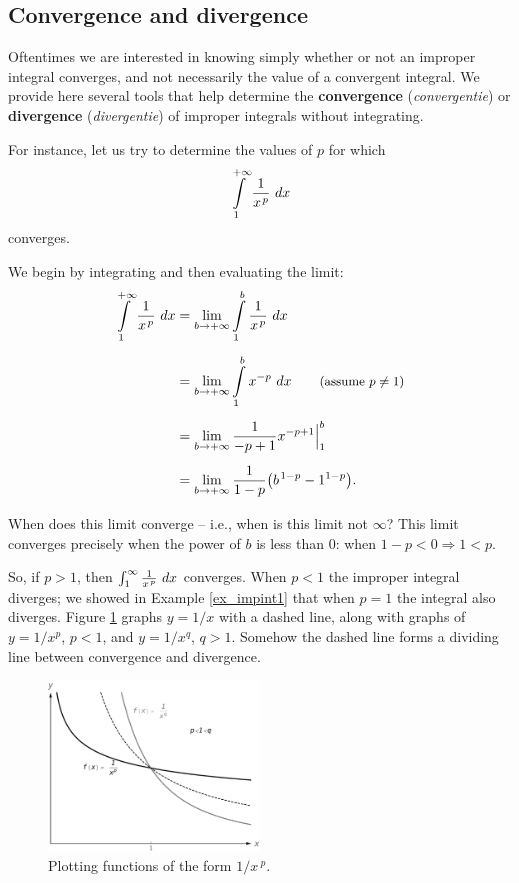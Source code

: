 \ifanalysis
\subsection{Convergence and divergence}

Oftentimes we are interested in knowing simply whether or not an improper integral converges, and not necessarily the value of a convergent integral. We provide here several tools that help determine the \textbf{convergence} (\textit{convergentie}) or \textbf{divergence} (\textit{divergentie}) of improper integrals without integrating.
 
 

For instance, let us try to determine the values of $p$ for which 
$$\displaystyle \int\limits_1^{+\infty} \frac1{x\hskip1pt ^p}\ dx$$
 converges.

We begin by integrating and then evaluating the limit:
\allowdisplaybreaks
\begin{align*}
\ds \int\limits_1^{+\infty} \frac1{x\hskip1pt ^p}\ dx &=	\lim_{b\to+\infty}\ds \int\limits_1^b\frac1{x\hskip1pt ^p}\ dx\\[0.2cm]
		&=	\lim_{b\to+\infty}\ds \int\limits_1^b x^{-p}\ dx \qquad \text{\small (assume $p\neq 1$)}\\[0.2cm]
		&= \lim_{b\to+\infty} \frac{1}{-p+1}x^{-p+1}\Big|_1^b\\[0.2cm]
		&= \lim_{b\to+\infty} \frac{1}{1-p}\big(b\hskip1pt^{1-p}-1^{1-p}\big).\\[0.2cm]
\end{align*}
When does this limit converge -- i.e., when is this limit not $\infty$? This limit converges precisely when the power of $b$ is less than 0: when $1-p<0 \Rightarrow 1<p$. 


So, if $p>1$, then $\int_1^\infty \frac1{x\hskip1pt ^p}\ dx $ converges. When $p<1$ the improper integral diverges; we showed in Example \ref{ex_impint1} that when $p=1$ the integral also diverges.  Figure \ref{fig_int_17} graphs $y=1/x$ with a dashed line, along with graphs of $y=1/x^p$, $p<1$, and $y=1/x^q$, $q>1$. Somehow the dashed line forms a dividing line between convergence and divergence. 

\begin{figure}
	\begin{center}
			\includegraphics[width=0.5\textwidth]{fig_int_17}
	\caption{Plotting functions of the form $1/x\,^p$.}
	\label{fig_int_17}
	\end{center}
\end{figure}

